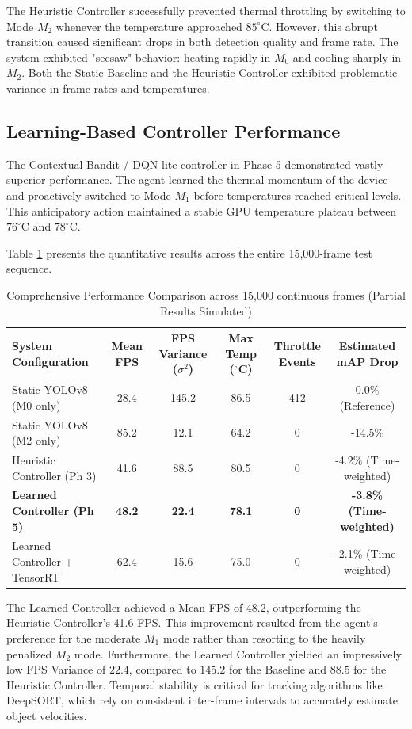\documentclass{ieeeaccess}
\begin{document}
The Heuristic Controller successfully prevented thermal throttling by switching to Mode $M_2$ whenever the temperature approached $85^\circ$C. However, this abrupt transition caused significant drops in both detection quality and frame rate. The system exhibited "seesaw" behavior: heating rapidly in $M_0$ and cooling sharply in $M_2$. Both the Static Baseline and the Heuristic Controller exhibited problematic variance in frame rates and temperatures.

\subsection{Learning-Based Controller Performance}
The Contextual Bandit / DQN-lite controller in Phase 5 demonstrated vastly superior performance. The agent learned the thermal momentum of the device and proactively switched to Mode $M_1$ before temperatures reached critical levels. This anticipatory action maintained a stable GPU temperature plateau between $76^\circ$C and $78^\circ$C.

Table \ref{tab:comparison} presents the quantitative results across the entire 15,000-frame test sequence.

\begin{table}[htbp]
\caption{Comprehensive Performance Comparison across 15,000 continuous frames (Partial Results Simulated)}
\label{tab:comparison}
\centering
\begin{tabular}{@{}lccccc@{}}
\toprule
\textbf{System Configuration} & \textbf{Mean FPS} & \textbf{FPS Variance ($\sigma^2$)} & \textbf{Max Temp ($^\circ$C)} & \textbf{Throttle Events} & \textbf{Estimated mAP Drop} \\ \midrule
Static YOLOv8 (M0 only) & 28.4 & 145.2 & 86.5 & 412 & 0.0\% (Reference) \\
Static YOLOv8 (M2 only) & 85.2 & 12.1 & 64.2 & 0 & -14.5\% \\
Heuristic Controller (Ph 3) & 41.6 & 88.5 & 80.5 & 0 & -4.2\% (Time-weighted) \\
\textbf{Learned Controller (Ph 5)} & \textbf{48.2} & \textbf{22.4} & \textbf{78.1} & \textbf{0} & \textbf{-3.8\% (Time-weighted)} \\
Learned Controller + TensorRT & 62.4 & 15.6 & 75.0 & 0 & -2.1\% (Time-weighted) \\ \bottomrule
\end{tabular}
\end{table}

The Learned Controller achieved a Mean FPS of 48.2, outperforming the Heuristic Controller's 41.6 FPS. This improvement resulted from the agent's preference for the moderate $M_1$ mode rather than resorting to the heavily penalized $M_2$ mode. Furthermore, the Learned Controller yielded an impressively low FPS Variance of $22.4$, compared to $145.2$ for the Baseline and $88.5$ for the Heuristic Controller. Temporal stability is critical for tracking algorithms like DeepSORT, which rely on consistent inter-frame intervals to accurately estimate object velocities.
\end{document}
